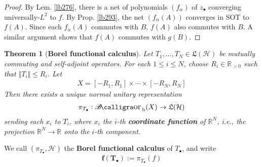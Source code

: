 \documentclass[12pt,b5paper,notitlepage]{article}
\theoremstyle{definition}
\theoremstyle{plain}
\newtheorem{thm}[df]{Theorem}
\DeclareMathOperator{\Borb}{{\mathscr{B}\text{\kern -2pt {\calligra\large or}}\,}_{\mathrm b}}
\newcommand{\fk}{\mathfrak}
\newcommand{\blt}{\bullet}
\newcommand{\Rbb}{\mathbb R}
\newcommand{\MH}{\mathcal H}
\numberwithin{equation}{section}
\begin{document}
\begin{proof}
By Lem. \ref{lb276}, there is a net of polynomials $(f_\alpha)$ of $z_\blt$ converging universally-$L^2$ to $f$. By Prop. \ref{lb293}, the net $(f_\alpha(A))$ converges in SOT to $f(A)$. Since each $f_\alpha(A)$ commutes with $B$, $f(A)$ also commutes with $B$. A similar argument shows that $f(A)$ commutes with $g(B)$.
\end{proof}




\begin{thm}[\textbf{Borel functional calculus}]\label{lb296}
Let $T_1,\dots,T_N\in\fk L(\MH)$ be mutually commuting and self-adjoint operators. For each $1\leq i\leq N$, choose $R_i\in\Rbb_{>0}$ such that $\Vert T_i\Vert\leq R_i$. Let 
\begin{align*}
X=[-R_1,R_1]\times\cdots\times[-R_N,R_N]
\end{align*}
Then there exists a unique normal unitary representation
\begin{align*}
\pi_{T_\blt}:\Borb(X)\rightarrow\fk L(\MH)
\end{align*}
sending each $x_i$ to $T_i$, where $x_i$ the $i$-th \textbf{coordinate function} of $\Rbb^N$, i.e., the projection $\Rbb^N\rightarrow\Rbb$ onto the $i$-th component.
\end{thm}

We call $(\pi_{T_\blt},\MH)$ the \textbf{Borel functional calculus}  of $T_\blt$, and write
\begin{align*}
\pmb{f(T_\blt)}:=\pi_{T_\blt}(f)
\end{align*}
\end{document}
